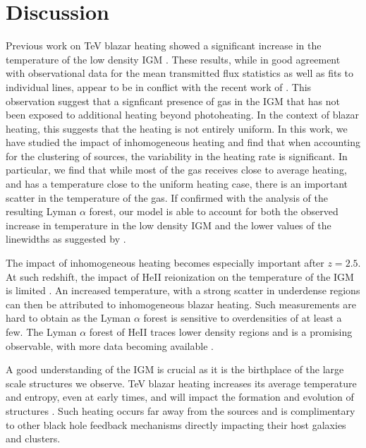 \documentclass[twocolumns]{emulateapj}
\begin{document}
\section{Discussion}

Previous work on TeV blazar heating showed a significant increase in the temperature of the low density IGM \citep{2012ApJ...752...23C,2012MNRAS.423..149P}.  These results, while in good agreement with  observational data for the mean transmitted flux statistics as well as fits to individual lines, appear to be in conflict with the recent work of \citep{2012ApJ...757L..30R}.  This observation suggest that a signficant presence of gas in the IGM that has not been exposed to additional heating beyond photoheating.  In the context of blazar heating, this suggests that the heating is not entirely uniform.  In this work, we have studied the impact of inhomogeneous heating and find that when accounting for the clustering of sources, the variability in the heating rate is significant.  In particular, we find that while most of the gas receives close to average heating, and has a temperature close to the uniform heating case, there is an important scatter in the temperature of the gas. If confirmed with the analysis of the resulting Lyman $\alpha$ forest, our model is able to account for both the observed increase in temperature in the low density IGM \citep{2014MNRAS.441.1916B,2009MNRAS.399L..39V} and the lower values  of the linewidths as suggested by \citet{2012ApJ...757L..30R}.

The impact of inhomogeneous heating becomes especially  important after $z=2.5$. At such redshift, the impact of HeII reionization  on the temperature of the IGM is  limited \citep{2013MNRAS.435.3169C}. An increased temperature, with a strong scatter in underdense regions can then be attributed to inhomogeneous blazar heating. Such measurements are hard to obtain as the Lyman $\alpha$ forest is sensitive to overdensities of at least a few.  The Lyman $\alpha$ forest of HeII traces lower density regions and is a promising observable, with more data becoming available \citep{2014arXiv1405.7405W}.

A good understanding of the IGM is crucial as it is the birthplace of the large scale structures we observe. TeV blazar heating increases its average temperature and entropy, even at early times, and will impact the formation and evolution of  structures \citep{2012ApJ...752...24P}. Such heating occurs far away from the sources and  is complimentary to other black hole feedback mechanisms directly impacting their host galaxies and clusters.
\end{document}
